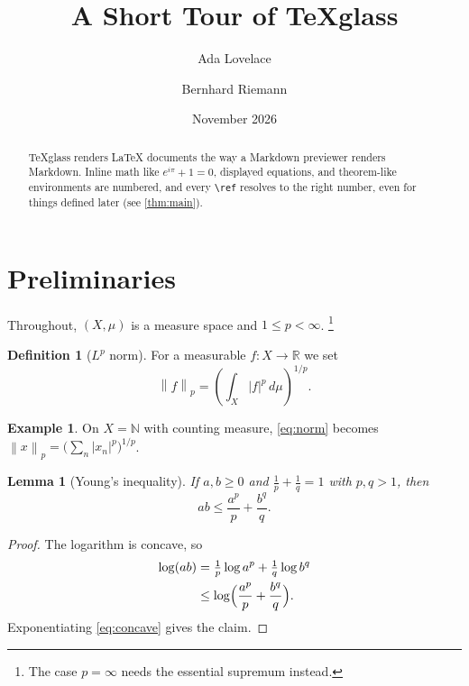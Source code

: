 \documentclass{amsart}
\title{A Short Tour of TeXglass}
\author{Ada Lovelace \and Bernhard Riemann}
\date{November 2026}
\newtheorem{lemma}[theorem]{Lemma}
\theoremstyle{definition}
\newtheorem{definition}[theorem]{Definition}
\newtheorem{example}[theorem]{Example}
\theoremstyle{remark}
\numberwithin{equation}{section}
\newcommand{\R}{\mathbb{R}}
\newcommand{\N}{\mathbb{N}}
\newcommand{\norm}[1]{\left\lVert #1 \right\rVert}
\begin{document}
\maketitle

\begin{abstract}
TeXglass renders \LaTeX{} documents the way a Markdown previewer renders
Markdown. Inline math like $e^{i\pi} + 1 = 0$, displayed equations, and
theorem-like environments are numbered, and every \verb|\ref| resolves to the
right number, even for things defined later (see \cref{thm:main}).
\end{abstract}

\tableofcontents

\section{Preliminaries}\label{sec:prelim}

Throughout, $(X, \mu)$ is a measure space and $1 \le p < \infty$.%
\footnote{The case $p = \infty$ needs the essential supremum instead.}

\begin{definition}[$L^p$ norm]\label{def:norm}
For a measurable $f \colon X \to \R$ we set
\begin{equation}\label{eq:norm}
  \norm{f}_p = \left( \int_X |f|^p \, d\mu \right)^{1/p}.
\end{equation}
\end{definition}

\begin{example}
On $X = \N$ with counting measure, \eqref{eq:norm} becomes
$\norm{x}_p = \bigl(\sum_n |x_n|^p\bigr)^{1/p}$.
\end{example}

\begin{lemma}[Young's inequality]\label{lem:young}
If $a, b \ge 0$ and $\frac1p + \frac1q = 1$ with $p, q > 1$, then
\[
  ab \le \frac{a^p}{p} + \frac{b^q}{q}.
\]
\end{lemma}

\begin{proof}
The logarithm is concave, so
\begin{align}
  \log(ab) &= \tfrac1p \log a^p + \tfrac1q \log b^q \nonumber \\
           &\le \log\Bigl( \frac{a^p}{p} + \frac{b^q}{q} \Bigr). \label{eq:concave}
\end{align}
Exponentiating \eqref{eq:concave} gives the claim.
\end{proof}
\end{document}
